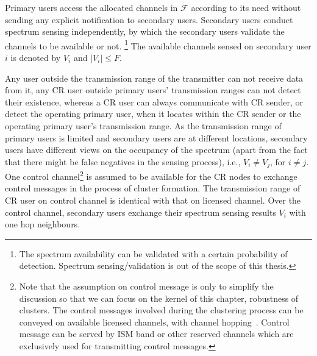 Primary users access the allocated channels in $\mathcal{F}$ according to its need without sending any explicit notification to secondary users.
Secondary users conduct spectrum sensing independently, by which the secondary users validate the channels to be available or not. \footnote{The spectrum availability can be validated with a certain probability of detection. Spectrum sensing/validation is out of the scope of this thesis.}
The available channels sensed on secondary user $i$ is denoted by $V_i$ and $\vert V_i \vert \leq F$. %


Any user outside the transmission range of the transmitter can not receive data from it, \ie  any CR user outside primary users' transmission ranges can not detect their existence, whereas a CR user can always communicate with CR sender, or detect the operating primary user, when it locates within the CR sender or the operating primary user's transmission range.
As the transmission range of primary users is limited and secondary users are at different locations, secondary users have different views on the occupancy of the spectrum (apart from the fact that there might be false negatives in the sensing process), i.e., $V_i \neq V_j$, for $i \neq j$.
One control channel\footnote{Note that the assumption on control message is only to simplify the discussion so that we can focus on the kernel of this chapter, robustness of clusters. The control messages involved during the clustering process can be conveyed on available licensed channels, \eg with channel hopping~\cite{channelHopping_Rendezvous_2014}. Control message can be served by ISM band or other reserved channels which are exclusively used for transmitting control messages. } is assumed to be available for the CR nodes to exchange control messages in the process of cluster formation.
The transmission range of CR user on control channel is identical with that on licensed channel.
Over the control channel, secondary users exchange their spectrum sensing results $V_{i}$ with one hop neighbours. 

